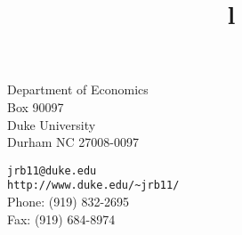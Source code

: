 \documentclass[margin,line,11pt,final]{res}
\begin{document}


\begin{resume}

\hspace{-0cm}
\begin{minipage}{1.25\linewidth}
  \begin{minipage}{0.45\linewidth}
    Department of Economics\\
    Box 90097 \\
    Duke University \\
    Durham NC 27008-0097
  \end{minipage}
  \hspace{\fill}
  \begin{minipage}{0.55\linewidth}
    {\tt jrb11@duke.edu} \\
    {\tt \verb+http://www.duke.edu/~jrb11/+} \\
    Phone: (919) 832-2695 \\
    Fax: (919) 684-8974
  \end{minipage}
\end{minipage}

\begin{format}
\title{l}\\
\\
\body\\
\end{format}


\end{resume}
\end{document}
